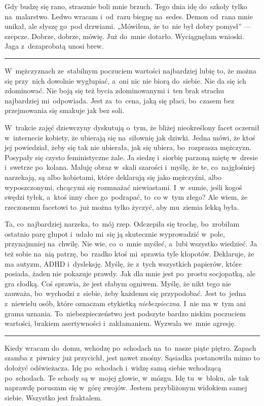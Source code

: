 \documentclass[9pt, a5paper]{memoir}
\begin{document}
Gdy budzę się rano, strasznie boli mnie brzuch. Tego dnia idę do~szkoły tylko na~malarstwo. Ledwo wracam i~od~razu biegnę na~sedes. Demon od~rana mnie unikał, ale słyszę go~pod drzwiami. „Mówiłem, że to~nie był dobry pomysł” --- szepcze. Dobrze, dobrze, mówię. Już do~mnie dotarło. Wyciągnęłam wnioski. Jaga z~dezaprobatą unosi brew.

\fancybreak{* \quad * \quad *}

W~mężczyznach ze~stabilnym poczuciem wartości najbardziej lubię to, że można się przy~nich dowolnie wygłupiać, a~oni nic nie biorą do~siebie. Nie da się ich zdominować. Nie boją się też bycia zdominowanymi i~ten brak strachu najbardziej mi~odpowiada. Jest za~to~cena, jaką się płaci, bo~czasem bez przejmowania się smakuje jak bez soli.

W~trakcie zajęć dziewczyny dyskutują o~tym, że bliżej nieokreślony facet oczernił w~internecie kobiety, że ubierają się na~siłownię jak dziwki. Jedna mówi, że ktoś jej powiedział, żeby się tak nie ubierała, jak się ubiera, bo~rozprasza mężczyzn. Posypały się czysto feministyczne żale. Ja siedzę i~siorbię parzoną miętę w~dresie i~swetrze po~kolana. Maluję obraz w~skali szarości i~myślę, że te, co~najgłośniej narzekają, są albo kobietami, które deklarują się jako mężczyźni, albo wyposzczonymi, chcącymi się rozmnażać niewiastami. I~w~sumie, jeśli kogoś swędzi tyłek, a~ktoś inny chce go~podrapać, to~co w~tym złego? Ale wiem, że rzeczonemu facetowi to~już można tylko życzyć, aby mu~ziemia lekką była.

Ta, co~najbardziej narzeka, to~mój rzep. Odczepiła się trochę, bo~zrobiłam ostatnio parę głupot i~udało mi~się ją skutecznie wyprowadzić w~pole, przynajmniej na~chwilę. Nie wie, co~o~mnie myśleć, a~lubi wszystko wiedzieć. Ja też sobie na~nią patrzę, bo~rzadko ktoś mi~sprawia tyle kłopotów. Deklaruje, że ma autyzm, ADHD i~dysleksję. Myślę, że z~tych wszystkich papierów, które posiada, żaden nie pokazuje prawdy. Jak dla mnie jest po~prostu socjopatką, ale gra słodką. Coś sprawia, że jest słabym ogniwem. Myślę, że nikt tego nie zauważa, bo~wychodzi z~siebie, żeby każdemu się przypodobać. Jest to~jedna z~niewielu osób, które oznaczam etykietką \textit{niebezpieczna}. I~nie ma w~tym ani grama uznania. To~niebezpieczeństwo jest podszyte bardzo niskim poczuciem wartości, brakiem asertywności i~zakłamaniem. Wyzwala we~mnie agresję.

\fancybreak{* \quad * \quad *}

Kiedy wracam do~domu, wchodzę po~schodach na~to~nasze piąte piętro. Zapach szamba z~piwnicy już przycichł, jest nawet znośny. Sąsiadka postanowiła mimo to dołożyć odświeżacza. Idę po~schodach i~widzę samą siebie wchodzącą po~schodach. Te schody są w~mojej głowie, w~mózgu. Idę tu~w~bloku, ale tak naprawdę poruszam się w~górę zwojów. Jestem przybliżonym widokiem samej siebie. Wszystko jest fraktalem.
\end{document}
